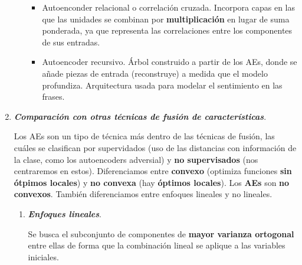 \begin{enumerate}
\begin{enumerate}
\begin{itemize}
            \item Autoenconder relacional o correlación cruzada. Incorpora capas en las que las unidades se combinan por \textbf{multiplicación} en lugar de suma ponderada, ya que representa las correlaciones entre los componentes de sus entradas.
            
            \item Autoencoder recursivo. Árbol construido a partir de los AEs, donde se añade piezas de entrada (reconstruye) a medida que el modelo profundiza. Arquitectura usada para modelar el sentimiento en las frases.
        \end{itemize}

    \end{enumerate}
    
    \newpage\item \textit{\textbf{Comparación con otras técnicas de fusión de características}}.
    \par
    Los AEs son un tipo de técnica más dentro de las técnicas de fusión, las cuáles se clasifican por supervidados (uso de las distancias con información de la clase, como los autoencoders adversial) y \textbf{no supervisados} (nos centraremos en estos). 
    Diferenciamos entre \textbf{convexo} (optimiza funciones \textbf{sin ótpimos locales}) y \textbf{no convexa} (hay \textbf{óptimos locales}). Los \textbf{AEs} son \textbf{no convexos}. También diferenciamos entre enfoques lineales y no lineales.
    
    \begin{enumerate}
        \item \textbf{\textit{Enfoques lineales}}.
        \par
        Se busca el subconjunto de componentes de \textbf{mayor varianza ortogonal} entre ellas de forma que la combinación lineal se aplique a las variables iniciales.
        

\end{enumerate}
\end{enumerate}
